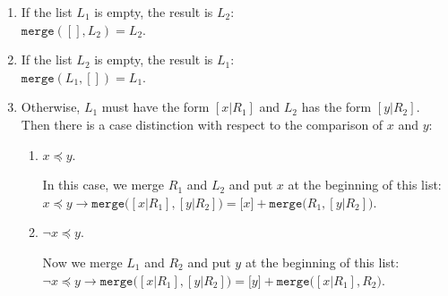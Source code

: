 \begin{enumerate}
\item If the list $L_1$ is empty, the result is $L_2$: \\[0.2cm]
      \hspace*{1.3cm} 
      $\mathtt{merge}([], L_2) = L_2$.
\item If the list $L_2$  is empty, the result is $L_1$: \\[0.2cm]
      \hspace*{1.3cm} 
      $\mathtt{merge}(L_1, []) = L_1$.
\item Otherwise, $L_1$ must have the form $[x|R_1]$ and $L_2$ has the form $[y|R_2]$.
      Then there is a case distinction with respect to the comparison of $x$ and $y$:
      \begin{enumerate}
      \item $x \preceq y$.

            In this case, we merge $R_1$ and $L_2$ and put $x$ at the beginning of this list:
            \\[0.2cm]
            \hspace*{1.3cm} 
            $x \preceq y \rightarrow \mathtt{merge}\bigl([x|R_1], [y|R_2]\bigr) = \bigl[x\bigr] + \mathtt{merge}\bigl(R_1,[y|R_2]\bigr)$.
      \item $\neg x \preceq y$.

            Now we merge $L_1$ and $R_2$ and put $y$ at the beginning of this list:
            \\[0.2cm]
            \hspace*{1.3cm} 
            $\neg x \preceq y \rightarrow \mathtt{merge}\bigl([x|R_1], [y|R_2]\bigr) = \bigl[y \bigr] + \mathtt{merge}\bigl([x|R_1],R_2\bigr)$.
      \end{enumerate}
\end{enumerate}

